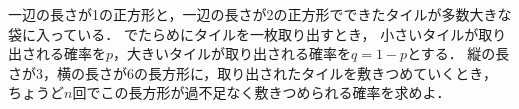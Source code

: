 \documentclass[../../main.tex]{subfiles}
\begin{document}
一辺の長さが1の正方形と，一辺の長さが2の正方形でできたタイルが多数大きな袋に入っている．
でたらめにタイルを一枚取り出すとき，
小さいタイルが取り出される確率を$p$，大きいタイルが取り出される確率を$q=1-p$とする．
縦の長さが3，横の長さが6の長方形に，取り出されたタイルを敷きつめていくとき，
ちょうど$n$回でこの長方形が過不足なく敷きつめられる確率を求めよ．
\end{document}
